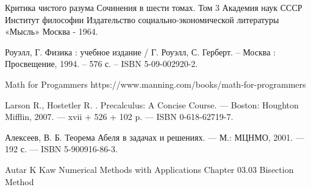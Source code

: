 \begingroup
\renewcommand{\section}[2]{\Anonchapter{Список использованных источников}}
\begin{thebibliography}{00}

    Критика чистого разума
    Сочинения в шести томах.  
    Том 3
    Академия наук СССР
    Институт философии
    Издательство социально-экономической литературы
    «Мысль»
    Москва - 1964. \TODO

    Роуэлл, Г. Физика : учебное издание / Г. Роуэлл, С. Герберт. -- Москва : Просвещение, 1994. -- 576 с. -- ISBN 5-09-002920-2.

    Math for Progammers \TODO
    https://www.manning.com/books/math-for-programmers

    Larson R., Hostetler R. . Precalculus: A Concise Course. — Boston: Houghton Mifflin, 2007. — xvii + 526 + 102 p. — ISBN 0-618-62719-7. \TODO

    Алексеев, В. Б. Теорема Абеля в задачах и решениях. — М.: МЦНМО, 2001. — 192 с. — ISBN 5-900916-86-3. \TODO

    \TODO Autar K Kaw Numerical Methods with Applications Chapter 03.03 Bisection Method

\end{thebibliography}
\endgroup

\clearpage
